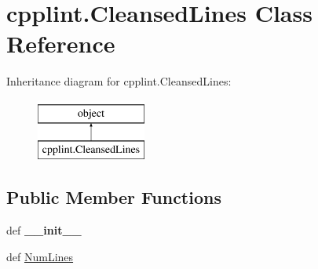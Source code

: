 \hypertarget{classcpplint_1_1CleansedLines}{\section{cpplint.\-Cleansed\-Lines Class Reference}
\label{classcpplint_1_1CleansedLines}
}
Inheritance diagram for cpplint.\-Cleansed\-Lines\-:\begin{figure}[H]
\begin{center}
\leavevmode
\includegraphics[height=2.000000cm]{classcpplint_1_1CleansedLines}
\end{center}
\end{figure}
\subsection*{Public Member Functions}
\begin{DoxyCompactItemize}
\item 
\hypertarget{classcpplint_1_1CleansedLines_a5be47afab0f6c15b446e3e8cba657266}{def {\bfseries \-\_\-\-\_\-init\-\_\-\-\_\-}}\label{classcpplint_1_1CleansedLines_a5be47afab0f6c15b446e3e8cba657266}

\item 
def \hyperlink{classcpplint_1_1CleansedLines_a768a3024ce576777a996121053404edd}{Num\-Lines}
\end{DoxyCompactItemize}
